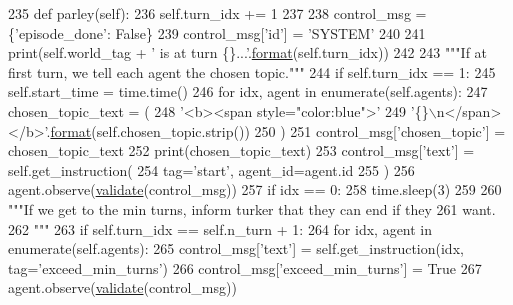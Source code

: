 \begin{DoxyCode}
235     \textcolor{keyword}{def }parley(self):
236         self.turn\_idx += 1
237 
238         control\_msg = \{\textcolor{stringliteral}{'episode\_done'}: \textcolor{keyword}{False}\}
239         control\_msg[\textcolor{stringliteral}{'id'}] = \textcolor{stringliteral}{'SYSTEM'}
240 
241         print(self.world\_tag + \textcolor{stringliteral}{' is at turn \{\}...'}.\hyperlink{namespaceparlai_1_1chat__service_1_1services_1_1messenger_1_1shared__utils_a32e2e2022b824fbaf80c747160b52a76}{format}(self.turn\_idx))
242 
243         \textcolor{stringliteral}{"""If at first turn, we tell each agent the chosen topic."""}
244         \textcolor{keywordflow}{if} self.turn\_idx == 1:
245             self.start\_time = time.time()
246             \textcolor{keywordflow}{for} idx, agent \textcolor{keywordflow}{in} enumerate(self.agents):
247                 chosen\_topic\_text = (
248                     \textcolor{stringliteral}{'<b><span style="color:blue">'}
249                     \textcolor{stringliteral}{'\{\}\(\backslash\)n</span></b>'}.\hyperlink{namespaceparlai_1_1chat__service_1_1services_1_1messenger_1_1shared__utils_a32e2e2022b824fbaf80c747160b52a76}{format}(self.chosen\_topic.strip())
250                 )
251                 control\_msg[\textcolor{stringliteral}{'chosen\_topic'}] = chosen\_topic\_text
252                 print(chosen\_topic\_text)
253                 control\_msg[\textcolor{stringliteral}{'text'}] = self.get\_instruction(
254                     tag=\textcolor{stringliteral}{'start'}, agent\_id=agent.id
255                 )
256                 agent.observe(\hyperlink{namespaceparlai_1_1core_1_1worlds_afc3fad603b7bce41dbdc9cdc04a9c794}{validate}(control\_msg))
257                 \textcolor{keywordflow}{if} idx == 0:
258                     time.sleep(3)
259 
260         \textcolor{stringliteral}{"""If we get to the min turns, inform turker that they can end if they}
261 \textcolor{stringliteral}{        want.}
262 \textcolor{stringliteral}{        """}
263         \textcolor{keywordflow}{if} self.turn\_idx == self.n\_turn + 1:
264             \textcolor{keywordflow}{for} idx, agent \textcolor{keywordflow}{in} enumerate(self.agents):
265                 control\_msg[\textcolor{stringliteral}{'text'}] = self.get\_instruction(idx, tag=\textcolor{stringliteral}{'exceed\_min\_turns'})
266                 control\_msg[\textcolor{stringliteral}{'exceed\_min\_turns'}] = \textcolor{keyword}{True}
267                 agent.observe(\hyperlink{namespaceparlai_1_1core_1_1worlds_afc3fad603b7bce41dbdc9cdc04a9c794}{validate}(control\_msg))

\end{DoxyCode}
